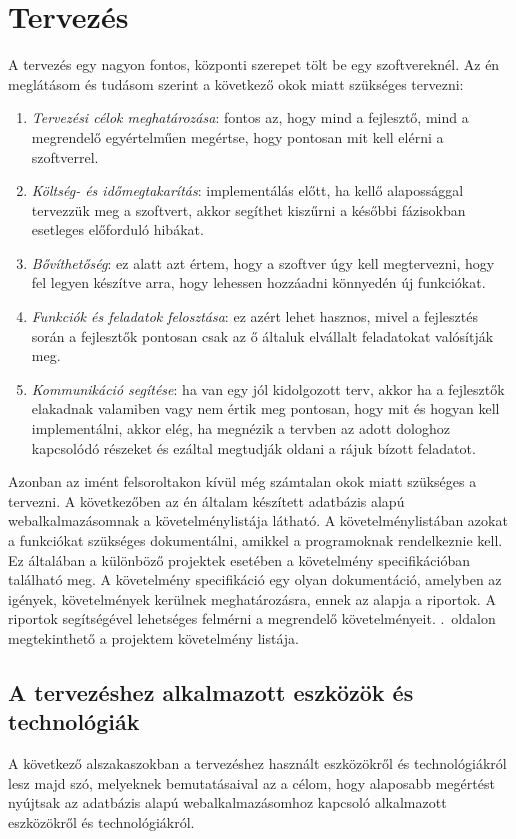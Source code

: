 \documentclass[]{thesis-ekf}
\theoremstyle{definition}
\theoremstyle{remark}
\begin{document}
	\chapter{Tervezés}
		A tervezés egy nagyon fontos, központi szerepet tölt be egy szoftvereknél. Az én meglátásom és tudásom szerint a következő okok miatt szükséges tervezni:
		\begin{enumerate}
			\item \emph{Tervezési célok meghatározása}: fontos az, hogy mind a fejlesztő, mind a megrendelő egyértelműen megértse, hogy pontosan mit kell elérni a szoftverrel.
			\item \emph{Költség- és időmegtakarítás}: implementálás előtt, ha kellő alapossággal tervezzük meg a szoftvert, akkor segíthet kiszűrni a későbbi fázisokban esetleges előforduló hibákat. 
			\item \emph{Bővíthetőség}: ez alatt azt értem, hogy a szoftver úgy kell megtervezni, hogy fel legyen készítve arra, hogy lehessen hozzáadni könnyedén új funkciókat.
			\item \emph{Funkciók és feladatok felosztása}: ez azért lehet hasznos, mivel a fejlesztés során a fejlesztők pontosan csak az ő általuk elvállalt feladatokat valósítják meg.
			\item \emph{Kommunikáció segítése}: ha van egy jól kidolgozott terv, akkor ha a fejlesztők elakadnak valamiben vagy nem értik meg pontosan, hogy mit és hogyan kell implementálni, akkor elég, ha megnézik a tervben az adott dologhoz kapcsolódó részeket és ezáltal megtudják oldani a rájuk bízott feladatot.
		\end{enumerate}
		Azonban az imént felsoroltakon kívül még számtalan okok miatt szükséges a tervezni. A következőben az én általam készített adatbázis alapú webalkalmazásomnak a követelménylistája látható. A követelménylistában azokat a funkciókat szükséges dokumentálni, amikkel a programoknak rendelkeznie kell. Ez általában a különböző projektek esetében a követelmény specifikációban található meg. A követelmény specifikáció egy olyan dokumentáció, amelyben az igények, követelmények kerülnek meghatározásra, ennek az alapja a riportok. A riportok segítségével lehetséges felmérni a megrendelő követelményeit. \Az{\pageref{kovetelmenylista}}.~oldalon megtekinthető a projektem követelmény listája.
		
	\section{A tervezéshez alkalmazott eszközök és technológiák}
		A következő alszakaszokban a tervezéshez használt eszközökről és technológiákról lesz majd szó, melyeknek bemutatásaival az a célom, hogy alaposabb megértést nyújtsak az adatbázis alapú webalkalmazásomhoz kapcsoló alkalmazott eszközökről és technológiákról.
\end{document}
